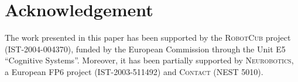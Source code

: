 \section*{Acknowledgement}
The work presented in this paper
has been supported by the \textsc{RobotCub} project (IST-2004-004370), funded by the
European Commission through the Unit E5 ``Cognitive Systems''. Moreover, it has
been partially supported by \textsc{Neurobotics}, a European FP6 
project (IST-2003-511492) and \textsc{Contact} (NEST 5010).



